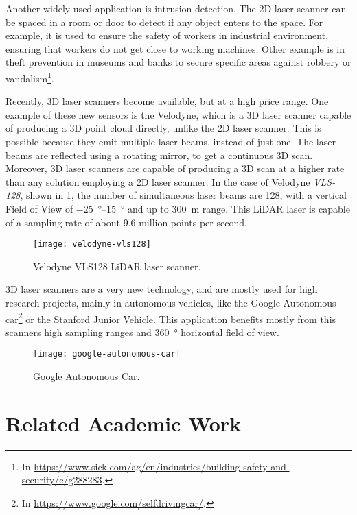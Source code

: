 Another widely used application is intrusion detection. The 2D laser scanner can be spaced in a room or door to detect if any object enters to the space. For example, it is used to ensure the safety of workers in industrial environment, ensuring that workers do not get close to working machines. Other example is in theft prevention in museums and banks to secure specific areas against robbery or vandalism\footnote{In \url{https://www.sick.com/ag/en/industries/building-safety-and-security/c/g288283}.}.

Recently, 3D laser scanners become available, but at a high price range. One example of these new sensors is the Velodyne, which is a 3D laser scanner capable of producing a 3D point cloud directly, unlike the 2D laser scanner. This is possible because they emit multiple laser beams, instead of just one. The laser beams are reflected using a rotating mirror, to get a continuous 3D scan. Moreover, 3D laser scanners are capable of producing a 3D scan at a higher rate than any solution employing a 2D laser scanner. In the case of Velodyne \emph{VLS-128}, shown in \cref{fig:velodyne-vls128}, the number of simultaneous laser beams are \num{128}, with a vertical Field of View of \SIrange{-25}{+15}{\degree} and up to \SI{300}{\meter} range. This LiDAR laser is capable of a sampling rate of about 9.6 million points per second.

\begin{figure}[h]
    \centering
    \texttt{[image: velodyne-vls128]}
    \caption{
        Velodyne VLS128 LiDAR laser scanner.}
    \label{fig:velodyne-vls128}
\end{figure}

3D laser scanners are a very new technology, and are mostly used for high research projects, mainly in autonomous vehicles, like the Google Autonomous car\footnote{In \url{https://www.google.com/selfdrivingcar/}.}  or the Stanford Junior Vehicle\cite{montemerlo08}. This application benefits mostly from this scanners high sampling ranges and \SI{360}{\degree} horizontal field of view.

\begin{figure}[h]
    \centering
    \texttt{[image: google-autonomous-car]}
    \caption{Google Autonomous Car.}
    \label{fig:google-autonomous-car}
\end{figure}

\section{Related Academic Work}

